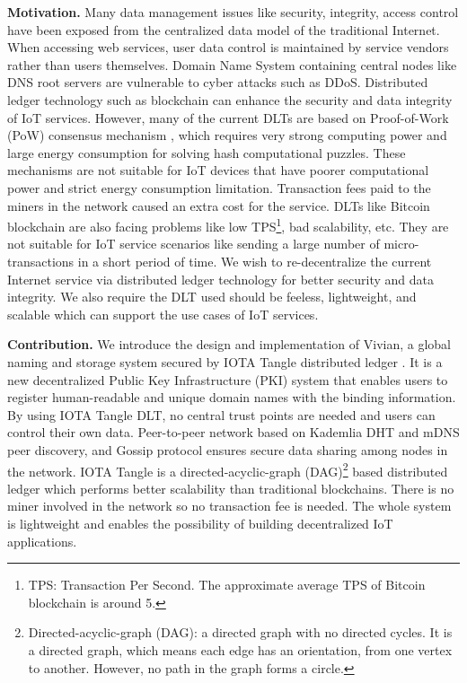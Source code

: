 \begin{onehalfspace}
\end{onehalfspace}
\noindent\textbf{Motivation.} Many data management issues like security, integrity, access control have been exposed from the centralized data model of the traditional Internet.
When accessing web services, user data control is maintained by service vendors rather than users themselves.
Domain Name System containing central nodes like DNS root servers are vulnerable to cyber attacks such as DDoS.
Distributed ledger technology such as blockchain can enhance the security and data integrity of IoT services.
However, many of the current DLTs are based on Proof-of-Work (PoW) consensus mechanism \cite{10.1145/2976749.2978341}, which requires very strong computing power and large energy consumption for solving hash computational puzzles.
These mechanisms are not suitable for IoT devices that have poorer computational power and strict energy consumption limitation. Transaction fees paid to the miners in the network caused an extra cost for the service.
DLTs like Bitcoin blockchain are also facing problems like low TPS\footnote{TPS: Transaction Per Second. The approximate average TPS of Bitcoin blockchain is around 5.}, bad scalability, etc.
They are not suitable for IoT service scenarios like sending a large number of micro-transactions in a short period of time. We wish to re-decentralize the current Internet service via distributed ledger technology for better security and data integrity.
We also require the DLT used should be feeless, lightweight, and scalable which can support the use cases of IoT services.


\begin{onehalfspace}
\end{onehalfspace}
\noindent\textbf{Contribution.} We introduce the design and implementation of Vivian, a global naming and storage system secured by IOTA Tangle distributed ledger \cite{popov2015tangle}.
It is a new decentralized Public Key Infrastructure (PKI) system that enables users to register human-readable and unique domain names with the binding information.
By using IOTA Tangle DLT, no central trust points are needed and users can control their own data.
Peer-to-peer network based on Kademlia DHT and mDNS peer discovery, and Gossip protocol ensures secure data sharing among nodes in the network.
IOTA Tangle is a directed-acyclic-graph (DAG)\footnote{Directed-acyclic-graph (DAG): a directed graph with no directed cycles. It is a directed graph, which means each edge has an orientation, from one vertex to another. However, no path in the graph forms a circle.} based distributed ledger which performs better scalability than traditional blockchains. There is no miner involved in the network so no transaction fee is needed.
The whole system is lightweight and enables the possibility of building decentralized IoT applications.